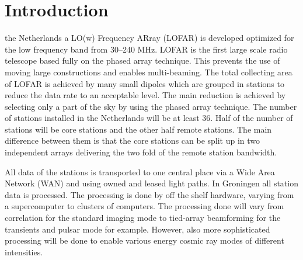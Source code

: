 \documentclass[journal]{IEEEtran}
\begin{document}
\section{Introduction}
% 
% 
% 
% 

 the Netherlands a LO(w) Frequency ARray (LOFAR) is developed optimized for the low frequency band from 30--240 MHz. LOFAR is the first large scale radio telescope based fully on the phased array technique. This prevents the use of moving large constructions and enables multi-beaming. The total collecting area of LOFAR is achieved by many small dipoles which are grouped in stations to reduce the data rate to an acceptable level. The main reduction is achieved by selecting only a part of the sky by using the phased array technique. The number of stations installed in the Netherlands will be at least 36. Half of the number of stations will be core stations and the other half remote stations. The main difference between them is that the core stations can be split up in two independent arrays delivering the two fold of the remote station bandwidth.

All data of the stations is transported to one central place via a Wide Area Network (WAN) and using owned and leased light paths. In Groningen all station data is processed. The processing is done by off the shelf hardware, varying from a supercomputer to clusters of computers. The processing done will vary from correlation for the standard imaging mode to tied-array beamforming for the transients and pulsar mode for example. However, also more sophisticated processing will be done to enable various energy cosmic ray modes of different intensities. 
\end{document}
